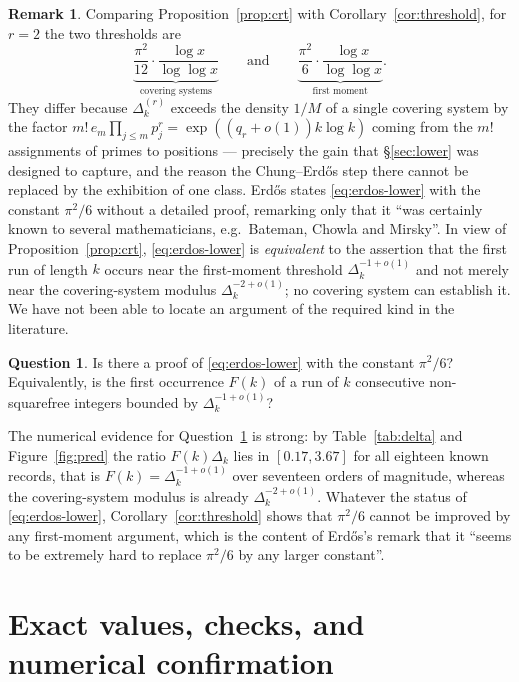 \documentclass[11pt,reqno]{amsart}
\theoremstyle{plain}
\theoremstyle{definition}
\newtheorem{question}[theorem]{Question}
\newtheorem{remark}[theorem]{Remark}
\numberwithin{equation}{section}
\begin{document}
\begin{remark}\label{rem:status}
Comparing Proposition~\ref{prop:crt} with Corollary~\ref{cor:threshold}, for $r=2$ the two
thresholds are
\[
  \underbrace{\frac{\pi^{2}}{12}\cdot\frac{\log x}{\log\log x}}_{\text{covering systems}}
  \qquad\text{and}\qquad
  \underbrace{\frac{\pi^{2}}{6}\cdot\frac{\log x}{\log\log x}}_{\text{first moment}} .
\]
They differ because $\Delta^{(r)}_k$ exceeds the density $1/M$ of a single covering system
by the factor $m!\,e_m\prod_{j\le m}p_j^{r}=\exp((q_r+o(1))k\log k)$ coming from the $m!$
assignments of primes to positions --- precisely the gain that \S\ref{sec:lower} was
designed to capture, and the reason the Chung--Erd\H{o}s step there cannot be replaced by
the exhibition of one class. Erd\H{o}s states \eqref{eq:erdos-lower} with the constant
$\pi^{2}/6$ without a detailed proof, remarking only that it ``was certainly known to
several mathematicians, e.g.\ Bateman, Chowla and Mirsky''. In view of
Proposition~\ref{prop:crt}, \eqref{eq:erdos-lower} is \emph{equivalent} to the assertion
that the first run of length $k$ occurs near the first-moment threshold
$\Delta_k^{-1+o(1)}$ and not merely near the covering-system modulus
$\Delta_k^{-2+o(1)}$; no covering system can establish it. We have not been able to locate
an argument of the required kind in the literature.
\end{remark}

\begin{question}\label{q:erdos20}
Is there a proof of \eqref{eq:erdos-lower} with the constant $\pi^{2}/6$? Equivalently, is
the first occurrence $F(k)$ of a run of $k$ consecutive non-squarefree integers bounded by
$\Delta_k^{-1+o(1)}$?
\end{question}

The numerical evidence for Question~\ref{q:erdos20} is strong: by Table~\ref{tab:delta} and
Figure~\ref{fig:pred} the ratio $F(k)\Delta_k$ lies in $[0.17,3.67]$ for all eighteen known
records, that is $F(k)=\Delta_k^{-1+o(1)}$ over seventeen orders of magnitude, whereas the
covering-system modulus is already $\Delta_k^{-2+o(1)}$. Whatever the status of
\eqref{eq:erdos-lower}, Corollary~\ref{cor:threshold} shows that $\pi^{2}/6$ cannot be
improved by any first-moment argument, which is the content of Erd\H{o}s's remark that it
``seems to be extremely hard to replace $\pi^{2}/6$ by any larger constant''.

\section{Exact values, checks, and numerical confirmation}
\label{sec:numerics}
\end{document}
